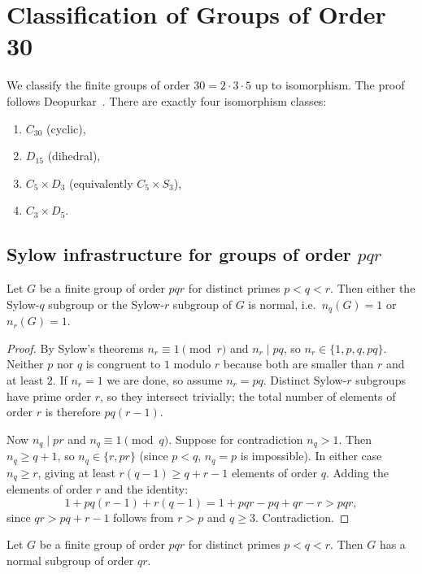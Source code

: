 \section{Classification of Groups of Order 30}
\label{order-30-classification}

We classify the finite groups of order $30 = 2 \cdot 3 \cdot 5$ up to isomorphism.
The proof follows Deopurkar~\cite{deopurkar_modern_2013}.
There are exactly four isomorphism classes:
\begin{enumerate}
  \item $C_{30}$ (cyclic),
  \item $D_{15}$ (dihedral),
  \item $C_5 \times D_3$ (equivalently $C_5 \times S_3$),
  \item $C_3 \times D_5$.
\end{enumerate}

\subsection{Sylow infrastructure for groups of order \(pqr\)}

\begin{lemma}\label{pqr_normal_sylow}
Let $G$ be a finite group of order $pqr$ for distinct primes $p < q < r$.
Then either the Sylow-$q$ subgroup or the Sylow-$r$ subgroup of $G$ is normal,
i.e.\ $n_q(G) = 1$ or $n_r(G) = 1$.
\end{lemma}

\begin{proof}
By Sylow's theorems $n_r \equiv 1 \pmod r$ and $n_r \mid pq$, so $n_r \in \{1, p, q, pq\}$.
Neither $p$ nor $q$ is congruent to $1$ modulo $r$ because both are smaller than $r$
and at least $2$. If $n_r = 1$ we are done, so assume $n_r = pq$.
Distinct Sylow-$r$ subgroups have prime order $r$, so they intersect trivially;
the total number of elements of order $r$ is therefore $pq(r-1)$.

Now $n_q \mid pr$ and $n_q \equiv 1 \pmod q$. Suppose for contradiction $n_q > 1$.
Then $n_q \geq q + 1$, so $n_q \in \{r, pr\}$ (since $p < q$, $n_q = p$ is impossible).
In either case $n_q \geq r$, giving at least $r(q-1) \geq q+r-1$ elements of order $q$.
Adding the elements of order $r$ and the identity:
\[
1 + pq(r-1) + r(q-1) = 1 + pqr - pq + qr - r > pqr,
\]
since $qr > pq + r - 1$ follows from $r > p$ and $q \geq 3$. Contradiction.
\end{proof}

\begin{theorem}\label{pqr_normal_subgroup_qr}
Let $G$ be a finite group of order $pqr$ for distinct primes $p < q < r$.
Then $G$ has a normal subgroup of order $qr$.
\end{theorem}

